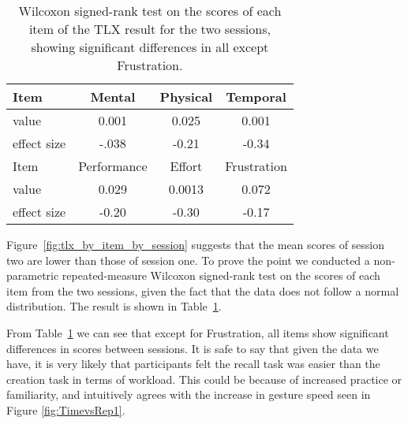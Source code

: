 \documentclass{sig-alternate-10pt}
\begin{document}
\begin{table}[!h]
\begin{center}
  \begin{tabular}{ l | c  c  c}
  \hline
	Item & Mental & Physical & Temporal\\ \hline
	 value & 0.001 & 0.025 & 0.001\\
	effect size & -.038 & -0.21 & -0.34\\	\hline
	Item & Performance & Effort & Frustration\\ \hline
	 value & 0.029 & 0.0013 & 0.072 \\
	effect size & -0.20 & -0.30 & -0.17 \\	
\end{tabular}
\caption{Wilcoxon signed-rank test on the scores of each item of the TLX result for the two sessions, showing significant differences in all except Frustration.}
    \label{tab:wilcoxon_tlx}
    \vspace{-11pt}
\end{center}
\end{table}

Figure~\ref{fig:tlx_by_item_by_session} suggests that the mean scores of session two are lower than those of session one. To prove the point we conducted a non-parametric repeated-measure Wilcoxon signed-rank test on the scores of each item from the two sessions, given the fact that the data does not follow a normal distribution. The result is shown in Table~\ref{tab:wilcoxon_tlx}.



From Table~\ref{tab:wilcoxon_tlx} we can see that except for Frustration, all items show significant differences in scores between sessions. It is safe to say that given the data we have, it is very likely that participants felt the recall task was easier than the creation task in terms of workload. This could be because of increased practice or familiarity, and intuitively agrees with the increase in gesture speed seen in Figure \ref{fig:TimevsRep1}.
\end{document}
